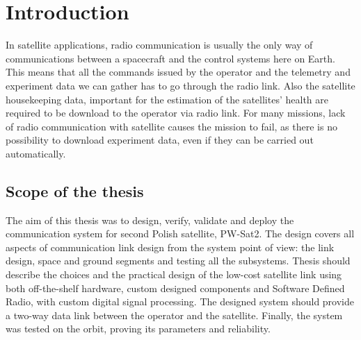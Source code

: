 \chapter{Introduction}
In satellite applications, radio communication is usually the only way of communications between a spacecraft and the control systems here on Earth. This means that all the commands issued by the operator and the telemetry and experiment data we can gather has to go through the radio link. Also the satellite housekeeping data, important for the estimation of the satellites' health are required to be download to the operator via radio link. For many missions, lack of radio communication with satellite causes the mission to fail, as there is no possibility to download experiment data, even if they can be carried out automatically.

\section{Scope of the thesis}
The aim of this thesis was to design, verify, validate and deploy the communication system for second Polish satellite, PW-Sat2. The design covers all aspects of communication link design from the system point of view: the link design, space and ground segments and testing all the subsystems. Thesis should describe the choices and the practical design of the low-cost satellite link using both off-the-shelf hardware, custom designed components and Software Defined Radio, with custom digital signal processing. The designed system should provide a two-way data link between the operator and the satellite. Finally, the system was tested on the orbit, proving its parameters and reliability.


